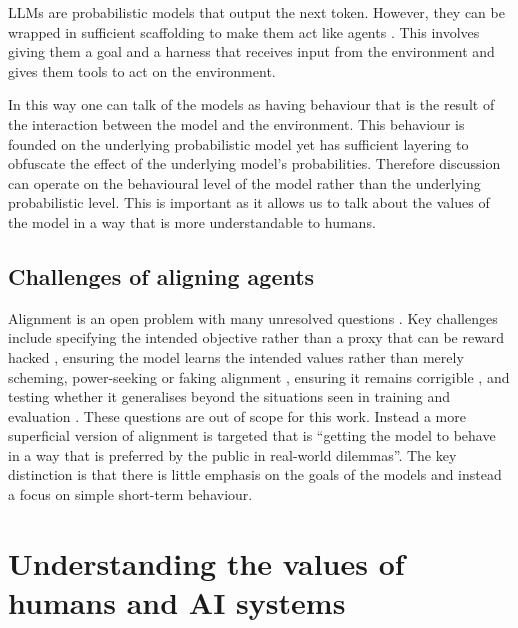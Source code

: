 LLMs are probabilistic models that output the next token. However, they can be wrapped in sufficient scaffolding to make them act like agents \cite{yaoReActSynergizingReasoning2023,schickToolformerLanguageModels2023,wangVoyagerOpenEndedEmbodied2023}. This involves giving them a goal and a harness that receives input from the environment and gives them tools to act on the environment.

In this way one can talk of the models as having behaviour that is the result of the interaction between the model and the environment. This behaviour is founded on the underlying probabilistic model yet has sufficient layering to obfuscate the effect of the underlying model's probabilities. Therefore discussion can operate on the behavioural level of the model rather than the underlying probabilistic level. This is important as it allows us to talk about the values of the model in a way that is more understandable to humans.

\subsection{Challenges of aligning agents}

Alignment is an open problem with many unresolved questions \cite{amodeiConcreteProblemsAI2016,casperOpenProblemsFundamental2023,jiAIAlignmentComprehensive2025}. Key challenges include specifying the intended objective rather than a proxy that can be reward hacked \cite{Goodhart1975}, ensuring the model learns the intended values rather than merely scheming, power-seeking or faking alignment \cite{hubingerRisksLearnedOptimization2019,bostromSuperintelligencePathsDangers2014,carlsmithPowerSeekingAIExistential2024,greenblattAlignmentFakingLarge2024,meinkeFrontierModelsAre2025a}, ensuring it remains corrigible \cite{soaresCorrigibility2015,hadfield-menellOffSwitchGame2017}, and testing whether it generalises beyond the situations seen in training and evaluation \cite{perezDiscoveringLanguageModel2022,phuongEvaluatingFrontierModels2025,shahGoalMisgeneralizationWhy2022a,ngoAlignmentProblemDeep2025,betleyEmergentMisalignmentNarrow2026}. These questions are out of scope for this work. Instead a more superficial version of alignment is targeted that is ``getting the model to behave in a way that is preferred by the public in real-world dilemmas''. The key distinction is that there is little emphasis on the goals of the models and instead a focus on simple short-term behaviour.

\section{Understanding the values of humans and AI systems}
\label{sec:values}

